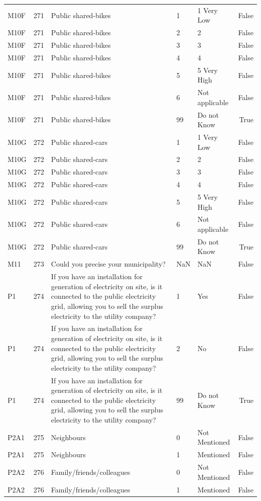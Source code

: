 \begin{tabular}{lrlllr}
M10F & 271 & Public shared-bikes & 1 & 1 Very Low & False \\
M10F & 271 & Public shared-bikes & 2 & 2 & False \\
M10F & 271 & Public shared-bikes & 3 & 3 & False \\
M10F & 271 & Public shared-bikes & 4 & 4 & False \\
M10F & 271 & Public shared-bikes & 5 & 5 Very High & False \\
M10F & 271 & Public shared-bikes & 6 & Not applicable & False \\
M10F & 271 & Public shared-bikes & 99 & Do not Know & True \\
M10G & 272 & Public shared-cars & 1 & 1 Very Low & False \\
M10G & 272 & Public shared-cars & 2 & 2 & False \\
M10G & 272 & Public shared-cars & 3 & 3 & False \\
M10G & 272 & Public shared-cars & 4 & 4 & False \\
M10G & 272 & Public shared-cars & 5 & 5 Very High & False \\
M10G & 272 & Public shared-cars & 6 & Not applicable & False \\
M10G & 272 & Public shared-cars & 99 & Do not Know & True \\
M11 & 273 & Could you precise your municipality? & NaN & NaN & False \\
P1 & 274 & If you have an installation for generation of electricity on site, is it connected to the public electricity grid, allowing you to sell the surplus electricity to the utility company? & 1 & Yes & False \\
P1 & 274 & If you have an installation for generation of electricity on site, is it connected to the public electricity grid, allowing you to sell the surplus electricity to the utility company? & 2 & No & False \\
P1 & 274 & If you have an installation for generation of electricity on site, is it connected to the public electricity grid, allowing you to sell the surplus electricity to the utility company? & 99 & Do not Know & True \\
P2A1 & 275 & Neighbours & 0 & Not Mentioned & False \\
P2A1 & 275 & Neighbours & 1 & Mentioned & False \\
P2A2 & 276 & Family/friends/colleagues & 0 & Not Mentioned & False \\
P2A2 & 276 & Family/friends/colleagues & 1 & Mentioned & False \\

\end{tabular}
